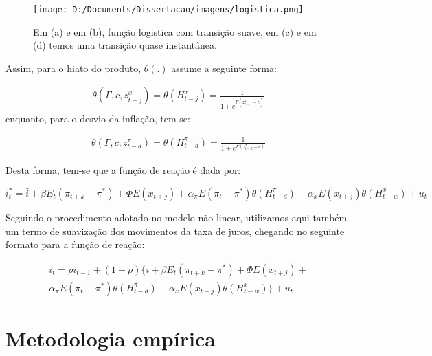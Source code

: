 \documentclass[
	article,			%
	11pt,				%
	oneside,			%
	a4paper,			%
	english,			%
	brazil,				%
	]{abntex2}
\begin{document}
	
	\hfill \break
	\hfill \break
	\hfill \break
	\hfill \break
	\hfill \break
	\hfill \break
	\hfill \break
	\hfill \break
	\hfill \break
	\hfill \break
	\hfill \break
	\hfill \break
	\hfill \break
	
	
	\begin{figure}[!h]
	\texttt{[image: D:/Documents/Dissertacao/imagens/logistica.png]}
	\caption{Em (a) e em (b), função logistica com transição suave, \protect\linebreak em (c) e em (d) temos uma transição quase instantânea. }
	\label{fig:logistica}
	\end{figure}
	
	
	
	Assim, para o hiato do produto, $\theta(.)$ assume a seguinte forma:
	
	\begin{eqnarray}  \label{func_log_hiato}
		\theta (\Gamma,c,z_{t-j}^x) = \theta (H_{t-j}^x) = \frac{1}{1+e^{\Gamma (z_{t-j}^x - c)}} 
	\end{eqnarray}
	enquanto, para o desvio da inflação, tem-se:
	
	\begin{eqnarray}  \label{func_log_inflacao}
		\theta (\Gamma,c,z_{t-d}^\pi) = \theta (H_{t-d}^\pi) = \frac{1}{1+e^{\Gamma (z_{t-d}^\pi - c)}} 
	\end{eqnarray}
	
	Desta forma, tem-se que a função de reação é dada por:
	
	\begin{equation}
		i_t^* = \bar{i} + \beta E_t(\pi_{t+k} - \pi^*) + \Phi E(x_{t+j}) + \alpha_\pi E(\pi_t - \pi^*)\theta(H_{t-d}^\pi) + \alpha_x E(x_{t+j}) \theta (H_{t-w}^x) + u_t
	\end{equation}
	
	Seguindo o procedimento adotado no modelo não linear, utilizamos aqui também um termo de suavização dos movimentos da taxa de juros, chegando no seguinte formato para a função de reação:
	
	\begin{eqnarray}  \label{modelo_nao_linear}
		i_t = \rho i_{t-1} + (1-\rho) \{ \bar{i} + \beta E_t(\pi_{t+k} - \pi^*) + \Phi E(x_{t+j}) + \nonumber \\ 
		 \alpha_\pi E(\pi_t - \pi^*)\theta(H_{t-d}^\pi) + \alpha_x E(x_{t+j}) \theta (H_{t-w}^x) \} + u_t
	\end{eqnarray}
	


	
	\section{Metodologia empírica}	
	
\end{document}
